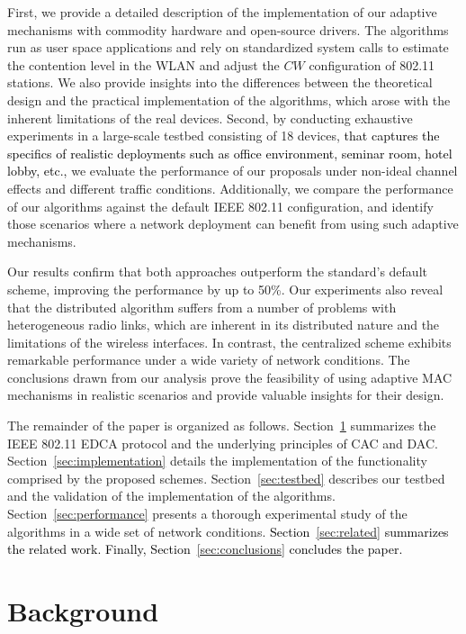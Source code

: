 \documentclass[a4paper,10pt]{article}
\newcommand{\revs}[1]{\textcolor{black}{#1}}
\begin{document}
First, we provide a detailed description of the implementation of our adaptive mechanisms with commodity hardware and open-source drivers. The algorithms run as user space applications and rely on standardized system calls to estimate the contention level in the WLAN and adjust the $CW$ configuration of 802.11 stations. 
We also provide insights into the differences between the theoretical design and the practical implementation of the algorithms, which arose with the inherent limitations of the real devices. 
Second, by conducting exhaustive experiments in a large-scale testbed consisting of 18 devices, \revs{that captures the specifics of realistic deployments such as office environment, seminar room, hotel lobby, etc.,} we evaluate the performance of our proposals under non-ideal channel effects and different traffic conditions. Additionally, we compare the performance of our algorithms against the default IEEE 802.11 configuration, and identify those scenarios where a network deployment can benefit from using such adaptive mechanisms.

Our results confirm that both approaches outperform the standard's default scheme, improving the performance by up to 50\%. Our experiments also reveal that the distributed algorithm suffers from a number of problems with heterogeneous radio links, which are inherent in its distributed nature and the limitations of the wireless interfaces. In contrast, the centralized scheme exhibits remarkable performance under a wide variety of network conditions. The conclusions drawn from our analysis prove the feasibility of using adaptive MAC mechanisms in realistic scenarios and provide valuable insights for their design.

The remainder of the paper is organized as follows. Section~\ref{sec:background} summarizes the IEEE 802.11 EDCA protocol and the underlying principles of CAC and DAC. Section~\ref{sec:implementation} details the implementation of the functionality comprised by the proposed schemes. Section~\ref{sec:testbed} describes our testbed and the validation of the implementation of the algorithms. Section~\ref{sec:performance} presents a thorough experimental study of the algorithms in a wide set of network conditions.  \revs{Section~\ref{sec:related} summarizes the related work. Finally, Section~\ref{sec:conclusions} concludes the paper.}


\section{Background}
\label{sec:background}
\end{document}
